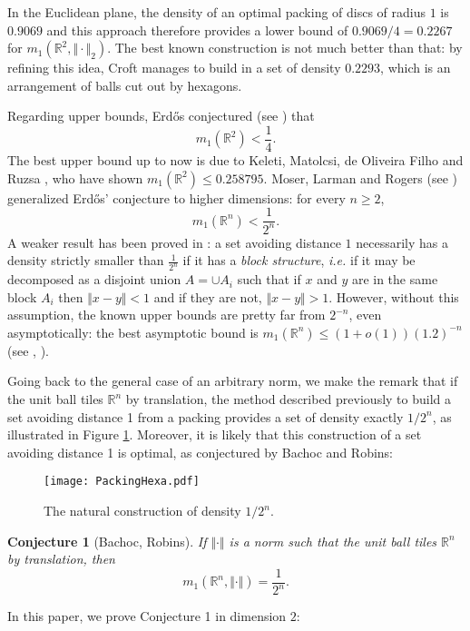 \documentclass{amsart}                     %
\newtheorem{conj}{Conjecture}
\newcommand{\R}{{\mathbb R}}
\begin{document}
In the Euclidean plane, the density of an optimal packing of discs of radius $1$ is $0.9069$ and this approach therefore provides a lower bound of $0.9069/4=0.2267$ for $m_1(\R^2,\Vert\cdot\Vert_2)$. 
The best known construction is not much better than that: by refining this idea, Croft manages to build in \cite{Croft} a set of density $0.2293$, which is an arrangement of balls cut out by hexagons.




Regarding upper bounds, Erd{\H o}s conjectured (see \cite{MR1954746}) that
$$m_1(\R^2)<\frac{1}{4}.$$
The best upper bound up to now is due to 
Keleti, Matolcsi, de Oliveira Filho and Ruzsa \cite{Keleti2016}, who have shown $m_1(\R^2)\leq 0.258795$.
Moser, Larman and Rogers (see \cite{MR0319055}) generalized Erd{\H o}s' conjecture to higher dimensions: for every $n \geq 2$,
$$m_1(\R^n)<\frac{1}{2^n}.$$
A weaker result has been proved in \cite{Keleti2016}: a set avoiding distance $1$ necessarily has a density strictly smaller than $\frac 1 {2^n}$ if it has a \textit{block structure}, \textit{i.e.} if it may be decomposed as a disjoint union $A=\cup A_i$ such that if $x$ and $y$ are in the same block $A_i$ then $\Vert   x-y \Vert   <1$ and if they are not, $\Vert   x-y \Vert   >1$. However, without this assumption, the known upper bounds are pretty far from $2^{-n}$, even asymptotically: the best asymptotic bound is $m_1(\R^n)\leq (1+ o(1))(1.2)^{-n}$ (see  \cite{MR0319055}, \cite{MR3341578}).



Going back to the general case of an arbitrary norm, we make the remark that if the unit ball tiles $\R^n$ by translation, the method described previously to build a set avoiding distance 1 from a packing provides a set of density exactly $1/2^n$, as illustrated in Figure \ref{PackHexa}. Moreover, it is likely that this construction of a set avoiding distance 1 is optimal, as conjectured by Bachoc and Robins:
\begin{figure}[!ht]
\texttt{[image: PackingHexa.pdf]}
\caption{The natural construction of density $1/2^n$.\label{PackHexa}}
\end{figure}


\begin{conj}[Bachoc, Robins]
If $\Vert \cdot \Vert$ is a norm such that the unit ball tiles $\R^n$ by translation, then
$$ m_1(\R^n,\Vert \cdot \Vert )= \frac{1}{2^n}. $$
\end{conj}


In this paper, we prove Conjecture 1 in dimension $2$:
\end{document}
